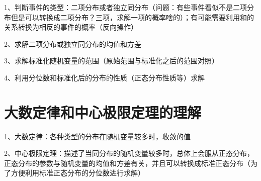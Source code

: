 1、判断事件的类型：二项分布或者独立同分布（问题：有些事件看似不是二项分布但是可以转换成二项分布？三项，求解一项的概率啥的）；有可能需要利用和的关系转换为相反的事件的概率（反向操作）

2、求解二项分布或独立同分布的均值和方差

3、求解标准化随机变量的范围（原始范围与标准化之后的范围对照）

4、利用分位数和标准化后的分布的性质（正态分布性质等）求解

\section{大数定律和中心极限定理的理解}

1、大数定律：各种类型的分布在随机变量较多时，收敛的值

2、中心极限定理：描述了当同分布的随机变量较多时，总体上会服从正态分布，正态分布的参数与随机变量的均值和方差有关，并且可以转换成标准正态分布（为了方便利用标准正态分布的分位数进行求解）

